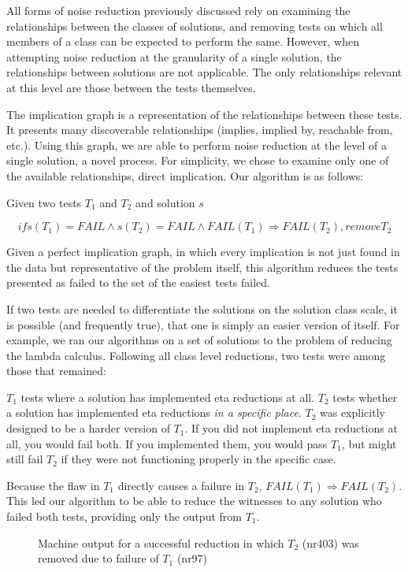 \documentclass[11pt]{article}
\begin{document}
All forms of noise reduction previously discussed rely on examining the relationships between the classes of solutions, and removing tests on which all members of a  class can be expected to perform the same. However, when attempting noise reduction at the granularity of a single solution, the relationships between solutions are not applicable. The only relationships relevant at this level  are those between the tests themselves.

The implication graph is a representation of the relationships between these tests. It presents many discoverable relationships (implies, implied by, reachable from, etc.). Using this graph, we are able to perform noise reduction at the level of a single solution, a novel process. For simplicity, we chose to examine only one of the available relationships, direct implication. Our algorithm is as follows:

\centerline{Given two tests $T_1$ and $T_2$ and solution $s$}
$$if s(T_1) = FAIL \wedge s(T_2) = FAIL \wedge FAIL(T_1) \Rightarrow FAIL(T_2), remove T_2$$

Given a perfect implication graph, in which every implication is not just found in the data but representative of the problem itself, this algorithm reduces the tests presented as  failed to the set of the easiest tests failed. 

If two tests are needed to differentiate the solutions on the solution class scale, it is possible (and frequently true), that one is simply an easier version of itself. For example, we ran our algorithms on a set of solutions to the problem of reducing the lambda calculus. Following all class level reductions, two tests were among those that remained:



$T_1$ tests where a solution has implemented eta reductions at all. $T_2$ tests whether a solution has implemented eta reductions \emph{in a specific place}. $T_2$ was explicitly designed to be a harder version of $T_1$. If you did not implement eta reductions at all, you would fail both. If you implemented them, you would pass $T_1$, but might still fail $T_2$ if they were not functioning properly in the specific case.

Because the flaw in $T_1$ directly causes a failure in $T_2$, $FAIL(T_1) \Rightarrow FAIL(T_2)$. This led our algorithm to be able to reduce the witnesses to any solution who failed both tests, providing only the output from $T_1$.

\begin{figure}

\caption{Machine output for a successful reduction in which $T_2$ (nr403) was removed due to failure of $T_1$ (nr97)}
\end{figure}
\end{document}
